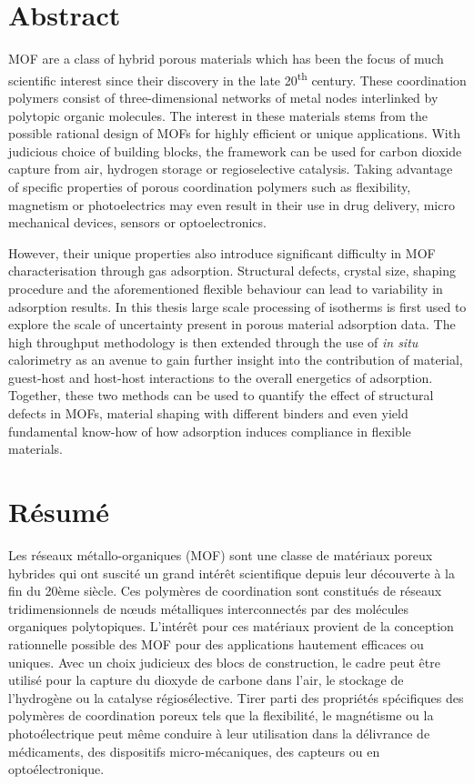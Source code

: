 
\chapter{Abstract}

\gls{MOF} are a class of hybrid porous materials
which has been the focus of much scientific interest since their
discovery in the late 20\textsuperscript{th} century. These
coordination polymers consist of three-dimensional networks of 
metal nodes interlinked by polytopic organic molecules. The 
interest in these materials stems from the possible rational design
of MOFs for highly efficient or unique applications. 
With judicious choice of building blocks, the framework can be used for
carbon dioxide capture from air, hydrogen storage or regioselective 
catalysis. Taking advantage of specific properties of porous 
coordination polymers such as flexibility, magnetism or photoelectrics
may even result in their use in drug delivery, micro mechanical devices,
sensors or optoelectronics.

However, their unique properties also introduce significant difficulty
in \gls{MOF} characterisation through gas adsorption. 
Structural defects, crystal size, shaping procedure
and the aforementioned flexible behaviour can lead to variability in
adsorption results. In this thesis large scale processing of 
isotherms is first used to explore the scale of uncertainty 
present in porous material adsorption data. The high throughput
methodology is then extended through the use of \textit{in situ} calorimetry
as an avenue to gain further insight into the contribution of material, 
guest-host and host-host interactions to the overall energetics of
adsorption. Together, these two methods can be used to quantify the effect
of structural defects in MOFs, material shaping with different binders 
and even yield fundamental know-how of how adsorption induces compliance
in flexible materials.

\pagebreak

\chapter{Résumé}

Les réseaux métallo-organiques (MOF) sont une classe de matériaux poreux
hybrides qui ont suscité un grand intérêt scientifique depuis leur 
découverte à la fin du 20ème siècle. Ces polymères de coordination sont 
constitués de réseaux tridimensionnels de nœuds métalliques interconnectés 
par des molécules organiques polytopiques. L'intérêt pour ces matériaux 
provient de la conception rationnelle possible des MOF pour des 
applications hautement efficaces ou uniques. Avec un choix judicieux des 
blocs de construction, le cadre peut être utilisé pour la capture du 
dioxyde de carbone dans l'air, le stockage de l'hydrogène ou la catalyse 
régiosélective. Tirer parti des propriétés spécifiques des polymères de 
coordination poreux tels que la flexibilité, le magnétisme ou la 
photoélectrique peut même conduire à leur utilisation dans la délivrance de 
médicaments, des dispositifs micro-mécaniques, des capteurs ou en 
optoélectronique.

